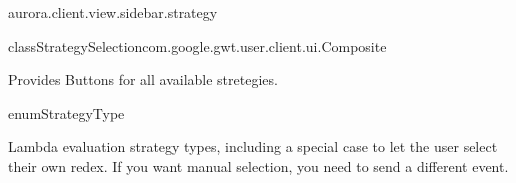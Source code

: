 \begin{texdocpackage}{aurora.client.view.sidebar.strategy}
\label{texdoclet:aurora.client.view.sidebar.strategy}

\begin{texdocclass}{class}{StrategySelection}{com.google.gwt.user.client.ui.Composite}{}
\label{texdoclet:aurora.client.view.sidebar.strategy.StrategySelection}
\begin{texdocclassintro}
Provides Buttons for all available stretegies.\end{texdocclassintro}
\begin{texdocclassconstructors}
\end{texdocclassconstructors}
\begin{texdocclassmethods}
\end{texdocclassmethods}
\end{texdocclass}


\begin{texdocclass}{enum}{StrategyType}{}{}
\label{texdoclet:aurora.client.view.sidebar.strategy.StrategyType}
\begin{texdocclassintro}
Lambda evaluation strategy types, including a special case to let the user select their own redex.
 If you want manual selection, you need to send a different event.\end{texdocclassintro}
\begin{texdocenums}
\end{texdocenums}
\begin{texdocclassmethods}
\end{texdocclassmethods}
\end{texdocclass}


\end{texdocpackage}



